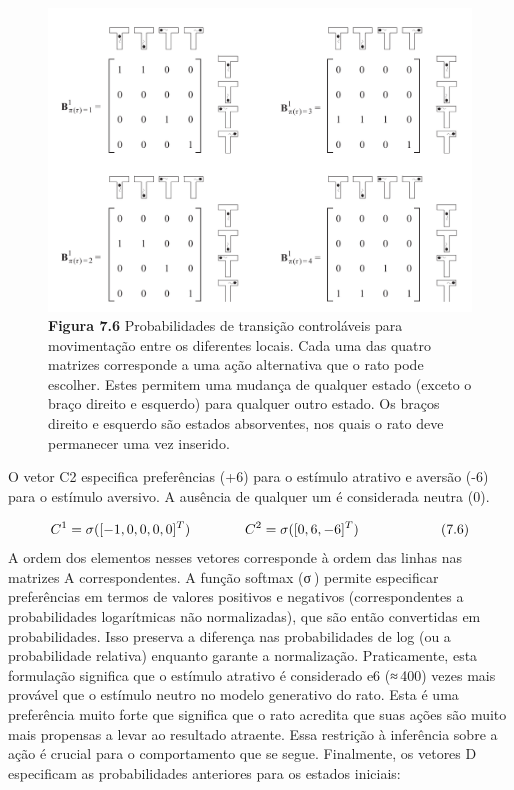 \documentclass[
  12pt,
]{book}
\begin{document}
\begin{figure}
\centering
\includegraphics{images/Figura_7_6.png}
\caption{\textbf{Figura 7.6} Probabilidades de transição controláveis para movimentação entre os diferentes locais. Cada uma das quatro matrizes corresponde a uma ação alternativa que o rato pode escolher. Estes permitem uma mudança de qualquer estado (exceto o braço direito e esquerdo) para qualquer outro estado. Os braços direito e esquerdo são estados absorventes, nos quais o rato deve permanecer uma vez inserido.}
\end{figure}

O vetor C2 especifica preferências (+6) para o estímulo atrativo e aversão (-6) para o estímulo aversivo. A ausência de qualquer um é considerada neutra (0).

\[ \begin{equation} 
C^1 = \sigma([-1,0,0,0,0]^T) \qquad\qquad\qquad\\ 
C^2 = \sigma([0,6,-6]^T)
\end{equation} \qquad\qquad\qquad (7.6) \]
A ordem dos elementos nesses vetores corresponde à ordem das linhas nas matrizes A correspondentes. A função softmax (σ ) permite especificar preferências em termos de valores positivos e negativos (correspondentes a probabilidades logarítmicas não normalizadas), que são então convertidas em probabilidades. Isso preserva a diferença nas probabilidades de log (ou a probabilidade relativa) enquanto garante a normalização. Praticamente, esta formulação significa que o estímulo atrativo é considerado e6 (≈ 400) vezes mais provável que o estímulo neutro no modelo generativo do rato. Esta é uma preferência muito forte que significa que o rato acredita que suas ações são muito mais propensas a levar ao resultado atraente. Essa restrição à inferência sobre a ação é crucial para o comportamento que se segue. Finalmente, os vetores D especificam as probabilidades anteriores para os estados iniciais:
\end{document}
